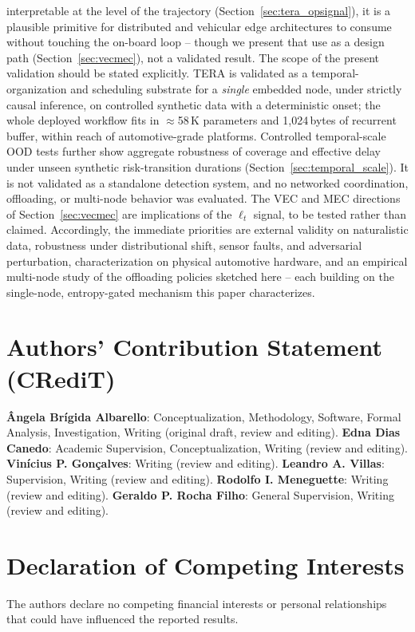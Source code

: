 \documentclass[a4paper,fleqn]{cas-dc}
\begin{document}
interpretable at the level of the trajectory (Section~\ref{sec:tera_opsignal}), it is
a plausible primitive for distributed and vehicular edge architectures to consume
without touching the on-board loop -- though we present that use as a design path
(Section~\ref{sec:vecmec}), not a validated result.
The scope of the present validation should be stated explicitly. TERA is validated
as a temporal-organization and scheduling substrate for a \emph{single} embedded
node, under strictly causal inference, on controlled synthetic data with a
deterministic onset; the whole deployed workflow fits in $\approx$58\,K parameters
and 1{,}024\,bytes of recurrent buffer, within reach of automotive-grade platforms.
{\color{\revcolor}Controlled temporal-scale OOD tests further show aggregate
robustness of coverage and effective delay under unseen synthetic
risk-transition durations (Section~\ref{sec:temporal_scale}).}
It is not validated as a standalone detection system, and no networked coordination,
offloading, or multi-node behavior was evaluated. The VEC and MEC directions of
Section~\ref{sec:vecmec} are implications of the $\ell_t$ signal, to be tested rather
than claimed. Accordingly, the immediate priorities are external validity on
naturalistic data, robustness under distributional shift, sensor faults, and
adversarial perturbation, characterization on physical automotive hardware, and an
empirical multi-node study of the offloading policies sketched here -- each building
on the single-node, entropy-gated mechanism this paper characterizes.
\section*{Authors' Contribution Statement (CRediT)}
\textbf{{\^A}ngela Br\'igida Albarello}: Conceptualization, Methodology,
Software, Formal Analysis, Investigation, Writing (original draft, review
and editing).
\textbf{Edna Dias Canedo}: Academic Supervision, Conceptualization,
Writing (review and editing).
\textbf{Vin\'icius P. Gon\c{c}alves}: Writing (review and editing).
\textbf{Leandro A. Villas}: Supervision, Writing (review and editing).
\textbf{Rodolfo I. Meneguette}: Writing (review and editing).
\textbf{Geraldo P. Rocha Filho}: General Supervision, Writing (review
and editing).
\section*{Declaration of Competing Interests}
The authors declare no competing financial interests or personal
relationships that could have influenced the reported results.
\end{document}
